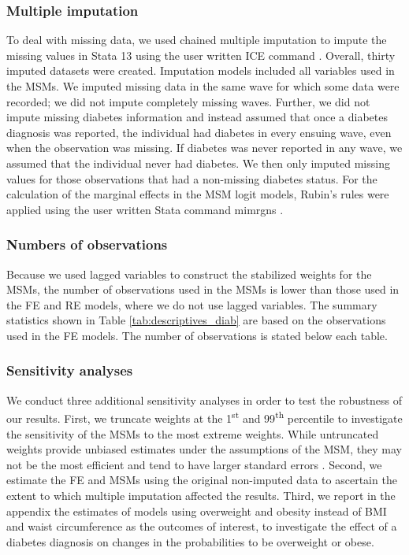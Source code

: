 \subsubsection*{Multiple imputation}

To deal with missing data, we used chained multiple imputation to impute the missing values in Stata 13 using the user written ICE command \parencite{Royston2009}. Overall, thirty imputed datasets were created. Imputation models included all variables used in the \acp{MSM}. We imputed missing data in the same wave for which some data were recorded; we did not impute completely missing waves. Further, we did not impute missing diabetes information and instead assumed that once a diabetes diagnosis was reported, the individual had diabetes in every ensuing wave, even when the observation was missing. If diabetes was never reported in any wave, we assumed that the individual never had diabetes. We then only imputed missing values for those observations that had a non-missing diabetes status. For the calculation of the marginal effects in the \ac{MSM} logit models, Rubin's rules were applied using the user written Stata command mimrgns \parencite{Klein2014}.

\subsubsection*{Numbers of observations}

Because we used lagged variables to construct the stabilized weights for the \acp{MSM}, the number of observations used in the \acp{MSM} is lower than those used in the \ac{FE} and \ac{RE} models, where we do not use lagged variables. The summary statistics shown in Table \ref{tab:descriptives_diab} are based on the observations used in the \ac{FE} models. The number of observations is stated below each table.

\subsubsection*{Sensitivity analyses}

We conduct three additional sensitivity analyses in order to test the robustness of our results. First, we truncate weights at the 1\textsuperscript{st} and 99\textsuperscript{th} percentile to investigate the sensitivity of the \acp{MSM} to the most extreme weights. While untruncated weights provide unbiased estimates under the assumptions of the \ac{MSM}, they may not be the most efficient and tend to have larger standard errors \parencite{Cole2008}. Second, we estimate the \ac{FE} and \acp{MSM} using the original non-imputed data to ascertain the extent to which multiple imputation affected the results. Third, we report in the appendix the estimates of models using overweight and obesity instead of \ac{BMI} and waist circumference as the outcomes of interest, to investigate the effect of a diabetes diagnosis on changes in the probabilities to be overweight or obese.

